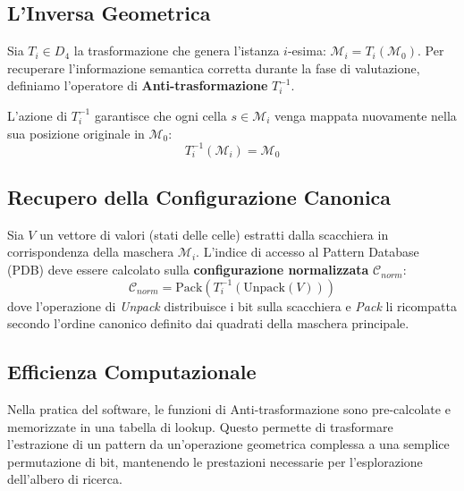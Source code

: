 \subsection{L'Inversa Geometrica}
Sia $T_i \in D_4$ la trasformazione che genera l'istanza $i$-esima: $\mathcal{M}_i = T_i(\mathcal{M}_0)$. Per recuperare l'informazione semantica corretta durante la fase di valutazione, definiamo l'operatore di \textbf{Anti-trasformazione} $T_i^{-1}$. 

L'azione di $T_i^{-1}$ garantisce che ogni cella $s \in \mathcal{M}_i$ venga mappata nuovamente nella sua posizione originale in $\mathcal{M}_0$:
\begin{equation}
    T_i^{-1}(\mathcal{M}_i) = \mathcal{M}_0
\end{equation}

\subsection{Recupero della Configurazione Canonica}
Sia $V$ un vettore di valori (stati delle celle) estratti dalla scacchiera in corrispondenza della maschera $\mathcal{M}_i$. L'indice di accesso al Pattern Database (PDB) deve essere calcolato sulla \textbf{configurazione normalizzata} $\mathcal{C}_{norm}$:
\begin{equation}
    \mathcal{C}_{norm} = \text{Pack}(T_i^{-1}(\text{Unpack}(V)))
\end{equation}
dove l'operazione di \textit{Unpack} distribuisce i bit sulla scacchiera e \textit{Pack} li ricompatta secondo l'ordine canonico definito dai quadrati della maschera principale. 

\subsection{Efficienza Computazionale}
Nella pratica del software, le funzioni di Anti-trasformazione sono pre-calcolate e memorizzate in una tabella di lookup. Questo permette di trasformare l'estrazione di un pattern da un'operazione geometrica complessa a una semplice permutazione di bit, mantenendo le prestazioni necessarie per l'esplorazione dell'albero di ricerca.
